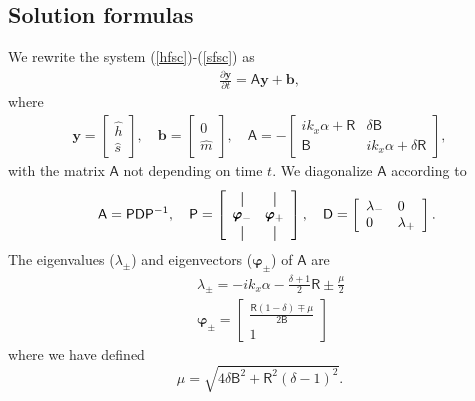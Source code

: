 \documentclass[paper=a4, fontsize=11pt]{article} %
\newcommand*{\vertbar}{\rule[-1ex]{0.5pt}{2.5ex}}
\begin{document}
\subsection{Solution formulas}
We rewrite the system (\ref{hfsc})-(\ref{sfsc}) as
\begin{eqnarray}
\frac{\partial\pmb{y}}{\partial t} = \mathsf{A}\pmb{y} + \pmb{b}, \label{ydot}
\end{eqnarray}
where
\begin{eqnarray}
\pmb{y} = \left[\begin{array}{ll}
\widehat{h} \\
\widehat{s}
\end{array}\right], \quad
\pmb{b} =
\left[\begin{array}{ll}
0\\
\widehat{m}
\end{array}\right],\quad
\mathsf{A} =-\left[\begin{array}{ll}
ik_x{\alpha}+ \mathsf{R} & \delta\mathsf{B} \\
\mathsf{B} & ik_x{\alpha}+\delta \mathsf{R}
\end{array}\right],
\label{Amat}
\end{eqnarray}
with the matrix $\mathsf{A}$ not depending on time $t$.
We diagonalize $\mathsf{A}$ according to
\begin{eqnarray}
&& \mathsf{A} = \mathsf{P}\mathsf{D}\mathsf{P}^{-1},\quad
 \mathsf{P} = \left[\begin{array}{cc}
\vertbar & \vertbar \\
\pmb{\varphi}_- & \pmb{\varphi}_+ \\
\vertbar & \vertbar
\end{array}\right],\quad
 \mathsf{D} = \left[\begin{array}{ll}
\lambda_-  & 0 \\
0 & \lambda_+
\end{array}\right].
\end{eqnarray}
The eigenvalues ($\lambda_\pm$) and eigenvectors ($\pmb{\varphi}_\pm$)
of $\mathsf{A}$ are
\begin{eqnarray}
&&\lambda_\pm = -ik_x{\alpha}-\frac{\delta+1}{2} \mathsf{R} \pm \frac{\mu}{2} \label{Lambda} \\
&&\pmb{\varphi}_\pm = \left[\begin{array}{c}
\frac{\mathsf{R}(1-\delta)\mp\mu}{2\mathsf{B}} \\
 1
\end{array}\right]
\end{eqnarray}
where we have defined
\begin{equation}
\mu = \sqrt{4\delta\mathsf{B}^2 +  \mathsf{R}^2(\delta-1)^2}.
\end{equation}
\end{document}
